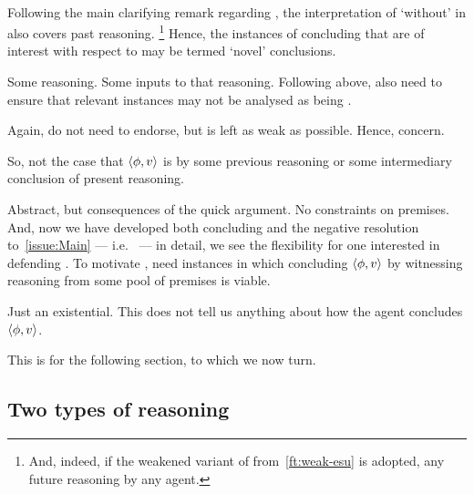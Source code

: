 \paragraph*{\EAS{}}

\begin{note}
  Following the main clarifying remark regarding \ESU{}, the interpretation of `without' in \EAS{} also covers past reasoning.%
  \footnote{
    And, indeed, if the weakened variant of \ESU{} from~\autoref{ft:weak-esu} is adopted, any future reasoning by any agent.
  }
  Hence, the instances of concluding that are of interest with respect to \EAS{} may be termed `novel' conclusions.
\end{note}

\begin{note}
  Some reasoning.
  Some inputs to that reasoning.
  Following above, also need to ensure that relevant instances may not be analysed as being \indicateVed{}.

  Again, do not need to endorse, but \ESU{} is left as weak as possible.
  Hence, concern.

  So, not the case that \(\langle \phi, v \rangle\) is \indicateVed{} by some previous reasoning or some intermediary conclusion of present reasoning.

  Abstract, but consequences of the quick argument.
  No constraints on premises.
  And, now we have developed both concluding and the negative resolution to~\autoref{issue:Main} --- i.e.~\ESU{} --- in detail, we see the flexibility for one interested in defending \ESU{}.
  To motivate \EAS{}, need instances in which concluding \(\langle \phi, v \rangle\) by witnessing reasoning from some pool of premises is viable.
\end{note}

\begin{note}[Uninformative]
  Just an existential.
  This does not tell us anything about how the agent concludes \(\langle \phi, v \rangle\).

  This is for the following section, to which we now turn.
\end{note}

\subsection{Two types of reasoning}
\label{sec:overview:two-types-reasoning}

